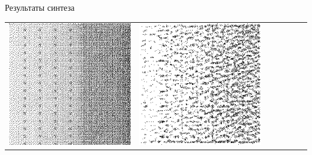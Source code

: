 \documentclass[12pt]{beamer}
\begin{document}
\begin{frame}{Результаты синтеза}
\begin{table}
\begin{center}
\begin{tabular}{p{1.2cm} p{1.2cm} p{1.2cm} p{1.2cm} p{1.2cm} p{1.2cm} p{1.2cm}}
					\includegraphics[width=1\linewidth]{8-results/sand-trend8/nf64e1/gen1}
					&
					\includegraphics[width=1\linewidth]{8-results/sand-trend8/nf64e5/gen1}
					&

\end{tabular}
\end{center}
\end{table}
\end{frame}
\end{document}
